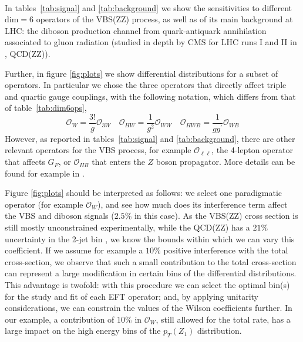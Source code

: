 
 
\\ 
In tables~\ref{tab:signal} and \ref{tab:background} we show the sensitivities to different $\mathrm{dim=6}$ operators of the VBS(ZZ) process, as well as of its main background at LHC: the diboson production channel from quark-antiquark annihilation associated to gluon radiation (studied in depth by CMS for LHC runs I and II in \cite{Sirunyan:2018vkx}, QCD(ZZ)). 

Further, in figure \ref{fig:plots} we show differential distributions for a subset of operators. In particular we chose the three operators that directly affect triple and quartic gauge couplings, with the following notation, which differs from that of table~\ref{tab:dim6ops},
\begin{equation}
\mathcal{O}_W = \frac{3!}{g}\mathcal{O}_{3W}\quad
\mathcal{O}_{HW} = \frac{1}{g^2}\mathcal{O}_{WW}\quad
\mathcal{O}_{HWB} = \frac{1}{gg^\prime}\mathcal{O}_{WB}
\end{equation}
However, as reported in tables~\ref{tab:signal} and \ref{tab:background}, there are other relevant operators for the VBS process, 
for example $\mathcal{O}_{\ell \ell}$, the 4-lepton operator that affects $G_F$, or $\mathcal{O}_{HB}$ that enters the $Z$ boson propagator. More details can be found for example in \cite{Ghezzi:2015vva}.
 
Figure \ref{fig:plots} should be interpreted as follows: we select one paradigmatic operator (for example $\mathcal{O}_W$), and see how much does its interference term affect the VBS and diboson signals ($2.5\%$ in this case). As the VBS(ZZ) cross section is still mostly unconstrained experimentally, while the QCD(ZZ) has a $21\%$ uncertainty in the 2-jet bin \cite{Sirunyan:2018vkx}, we know the bounds within which we can vary this coefficient. If we assume for example a $10 \%$ positive interference with the total cross-section, we observe that such a small contribution to the total cross-section can represent a large modification in certain bins of the differential distributions. This advantage is twofold: with this procedure we can select the optimal bin(s) for the study and fit of each EFT operator; and, by applying unitarity considerations, we can constrain the values of the Wilson coefficients further. In our example, a contribution of $10 \%$ in $\mathcal{O}_W$, still allowed for the total rate, has a large impact on the high energy bins of the $p_T (Z_1)$ distribution. 
\\
 
